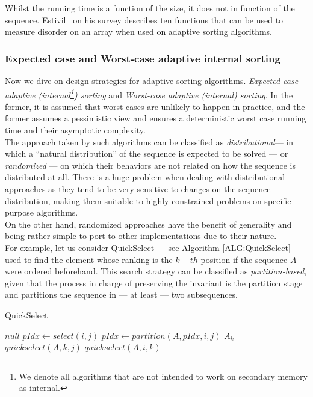 Whilst the running time is a function of the size, it does not in function of the sequence. Estivil~\cite{estivil92} on his survey describes ten functions that can be used to measure disorder on an array when used on adaptive sorting algorithms.\\

\subsubsection{Expected case and Worst-case adaptive internal sorting}

Now we dive on design strategies for adaptive sorting algorithms. \textit{Expected-case adaptive (internal\footnote{We denote all algorithms that are not intended to work on secondary memory as internal.}) sorting} and \textit{Worst-case adaptive (internal) sorting}. In the former, it is assumed that worst cases are unlikely to happen in practice, and the former assumes a pessimistic view and ensures a deterministic worst case running time and their asymptotic complexity.\\

The approach taken by such algorithms can be classified as \textit{distributional}--- in which a ``natural distribution'' of the sequence is expected to be solved --- or \textit{randomized} --- on which their behaviors are not related on how the sequence is distributed at all. There is a huge problem when dealing with distributional approaches as they tend to be very sensitive to changes on the sequence distribution, making them suitable to highly constrained problems on specific-purpose algorithms.\\

On the other hand, randomized approaches have the benefit of generality and being rather simple to port to other implementations due to their nature.\\

For example, let us consider QuickSelect --- see Algorithm \ref{ALG:QuickSelect} --- used to find the element whose ranking is the $k-th$ position if the sequence $A$ were ordered beforehand. This search strategy can be classified as \textit{partition-based}, given that the process in charge of preserving the invariant is the partition stage and partitions the sequence in --- at least --- two subsequences.\\


\begin{algorithm}
  \caption{QuickSelect}\label{ALG:QuickSelect}
  \begin{algorithmic}[1]
     \Return $null$
    \EndIf
    \State $pIdx \gets select(i,j)$
    \State $pIdx \gets partition(A,pIdx,i,j)$
     \Return $A_k$
    \EndIf
     \Return $quickselect(A, k, j)$
    \EndIf
     \Return $quickselect(A, i, k)$
    \EndIf
    \EndProcedure
  \end{algorithmic}
\end{algorithm}

